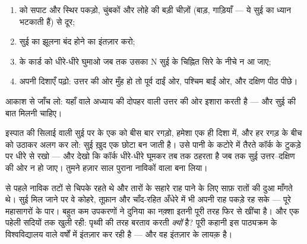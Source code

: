 \begin{method}[दिक्सूचक काम में लाना]\label{met:g4:magnets-and-compass:use}
\begin{enumerate}
  \item {} को सपाट और स्थिर पकड़ो, चुंबकों और लोहे की बड़ी
        चीज़ों (बाड़, गाड़ियाँ --- ये सुई का ध्यान भटकाती हैं) से
        दूर;
  \item सुई का झूलना बंद होने का इंतज़ार करो;
  \item {} के कार्ड को धीरे-धीरे घुमाओ जब तक उसका N सुई के
        चिह्नित सिरे के नीचे न आ जाए;
  \item अपनी दिशाएँ पढ़ो: उत्तर की ओर मुँह हो तो पूर्व दाईं ओर,
        पश्चिम बाईं ओर, और दक्षिण पीठ पीछे।
\end{enumerate}
आकाश से जाँच लो: यहाँ  वाले अध्याय की दोपहर वाली  उत्तर की
ओर इशारा करती है ---  और सुई की बात मिलनी चाहिए।
\end{method}

\begin{example}[अपना दिक्सूचक ख़ुद बनाओ]\label{ex:g4:magnets-and-compass:make}
इस्पात की सिलाई वाली सुई पर  के एक  को बीस बार रगड़ो, हमेशा
एक ही दिशा में, और हर रगड़ के बीच  को उठाकर अलग कर लो: सुई ख़ुद
एक छोटा  बन जाती है। उसे पानी के कटोरे में तैरते कॉर्क के टुकड़े
पर धीरे से रखो --- और देखो कि कॉर्क धीरे-धीरे घूमकर तब तक ठहरता है जब
तक सुई उत्तर--दक्षिण की ओर न हो जाए। तुमने हज़ार साल पुराना
नाविकों वाला  बना लिया।
\end{example}

\begin{remark}[वह उपकरण जिसने महासागर खोल दिए]\label{rem:g4:magnets-and-compass:history}
 से पहले नाविक तटों से चिपके रहते थे और तारों के सहारे राह
पाने के लिए साफ़ रातों की दुआ माँगते थे।  सुई मिल जाने पर वे
कोहरे, तूफ़ान और चाँद-रहित अँधेरे में भी अपनी राह पकड़े रह सके ---
पूरे महासागरों के पार। बहुत कम उपकरणों ने दुनिया का नक़्शा इतनी पूरी
तरह फिर से खींचा है। और एक पहेली सदियों तक खुली रही: पृथ्वी  की
तरह बरताव करती \emph{क्यों} है? पूरी कहानी इस पाठ्यक्रम के
विश्वविद्यालय वाले वर्षों में इंतज़ार कर रही है --- और वह इंतज़ार के
लायक़ है।
\end{remark}

